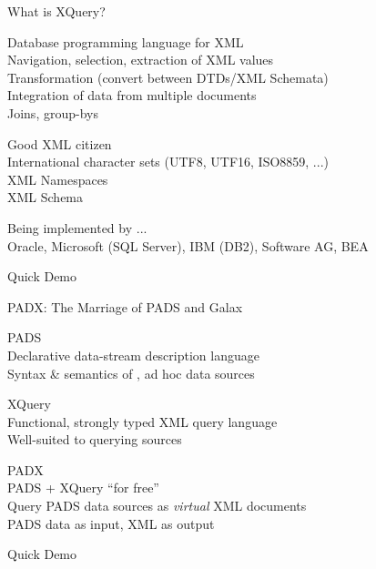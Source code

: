 \documentclass[landscape]{slides}
\begin{document}
\begin{Slide}{What is XQuery?}

  \bb Database programming language for XML \\
  \bbb Navigation, selection, extraction of XML values \\
  \bbb Transformation (convert between DTDs/XML Schemata)\\
  \bbb Integration of data from multiple documents \\
  \bbbb Joins, group-bys

  \bb Good XML citizen\\
  \bbb International character sets (UTF8, UTF16, ISO8859, ...) \\
  \bbb XML Namespaces \\
  \bbb XML Schema 

  \bb Being implemented by ...\\
  \bbb Oracle, Microsoft (SQL Server), IBM (DB2), Software AG, BEA

  \bb Quick Demo 

\end{Slide}

\begin{Slide}{PADX: The Marriage of PADS and Galax}
  
  \vspace*{1cm}
  \bb PADS\\
  \bbb Declarative data-stream description language\\
  \bbb Syntax \& semantics of \emph{}, ad hoc data sources 

  \bb XQuery\\
  \bbb Functional, strongly typed XML query language \\
  \bbb Well-suited to querying \emph{} sources

  \bb PADX\\
  \bbb PADS + XQuery ``for free'' \\
  \bbb Query PADS data sources as \emph{virtual} XML documents \\
  \bbbb PADS data as input, XML as output

  \bb Quick Demo 
\end{Slide}
\end{document}
